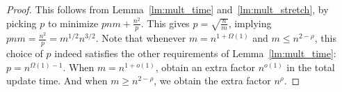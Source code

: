 \mainthm*
\begin{proof}
    This follows from Lemma~\ref{lm:mult_time} and~\ref{lm:mult_stretch}, by picking $p$ to minimize $pnm + \tfrac{n^2}{ p}$. This gives $p=\sqrt{\tfrac{n}{m}}$, implying $pnm=\tfrac{n^2}{p}=m^{1/2}n^{3/2}$.
Note that whenever $m=n^{1+\Omega(1)}$ and $m\leq n^{2-\rho}$, this choice of $p$ indeed satisfies the other requirements of Lemma~\ref{lm:mult_time}: $p=n^{\Omega(1)-1}$. When $m=n^{1+o(1)}$, obtain an extra factor $n^{o(1)}$ in the total update time. And when $m\geq n^{2-\rho}$, we obtain the extra factor $n^{\rho}$.
\end{proof}



